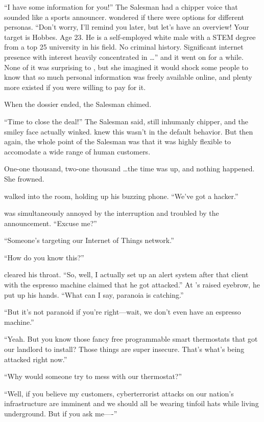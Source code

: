 ``I have some information for you!'' The Salesman had a chipper voice that sounded like a sports announcer. {\protag} wondered if there were options for different personas. ``Don't worry, I'll remind you later, but let's have an overview! Your target is {\sidetag} Hobbes. Age 23. He is a self-employed white male with a STEM degree from a top 25 university in his field. No criminal history. Significant internet presence with interest heavily concentrated in \dots'' and it went on for a while. None of it was surprising to {\protag}, but she imagined it would shock some people to know that so much personal information was freely available online, and plenty more existed if you were willing to pay for it.

When the dossier ended, the Salesman chimed.

``Time to close the deal!'' The Salesman said, still inhumanly chipper, and the smiley face actually winked. {\protag} knew this wasn't in the default behavior. But then again, the whole point of the Salesman was that it was highly flexible to accomodate a wide range of human customers.

One-one thousand, two-one thousand \dots the time was up, and nothing happened. She frowned. 

{\sidetag} walked into the room, holding up his buzzing phone. ``We've got a hacker.''

{\protag} was simultaneously annoyed by the interruption and troubled by the announcement. ``Excuse me?''

``Someone's targeting our Internet of Things network.''

``How do you know this?''

{\sidetag} cleared his throat. ``So, well, I actually set up an alert system after that client with the espresso machine claimed that he got attacked.'' At {\protag}'s raised eyebrow, he put up his hands. ``What can I say, paranoia is catching.''

``But it's not paranoid if you're right---wait, we don't even have an espresso machine.''

``Yeah. But you know those fancy free programmable smart thermostats that \crunchyCity{} got our landlord to install? Those things are super insecure. That's what's being attacked right now.''

``Why would someone try to mess with our thermostat?''

``Well, if you believe my customers, cyberterrorist attacks on our nation's infrastructure are imminent and we should all be wearing tinfoil hats while living underground. But if you ask me----''

